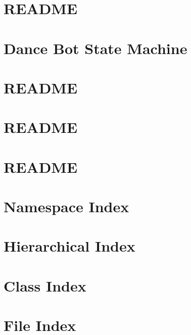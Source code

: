 \documentclass[twoside]{book}
\newcommand{\+}{\discretionary{\mbox{\scriptsize$\hookleftarrow$}}{}{}}
\begin{document}
\chapter{R\+E\+A\+D\+ME}
\label{md_smacc_sm_reference_library_sm_dance_bot_2_README}
\hypertarget{md_smacc_sm_reference_library_sm_dance_bot_2_README}{}

\chapter{Dance Bot State Machine}
\label{md_smacc_sm_reference_library_sm_dance_bot_3_launch_readme}
\hypertarget{md_smacc_sm_reference_library_sm_dance_bot_3_launch_readme}{}

\chapter{R\+E\+A\+D\+ME}
\label{md_smacc_sm_reference_library_sm_dance_bot_3_README}
\hypertarget{md_smacc_sm_reference_library_sm_dance_bot_3_README}{}

\chapter{R\+E\+A\+D\+ME}
\label{md_smacc_sm_reference_library_sm_three_some_README}
\hypertarget{md_smacc_sm_reference_library_sm_three_some_README}{}

\chapter{R\+E\+A\+D\+ME}
\label{md_smacc_sm_reference_library_sm_viewer_sim_README}
\hypertarget{md_smacc_sm_reference_library_sm_viewer_sim_README}{}

\chapter{Namespace Index}

\chapter{Hierarchical Index}

\chapter{Class Index}

\chapter{File Index}

\end{document}

